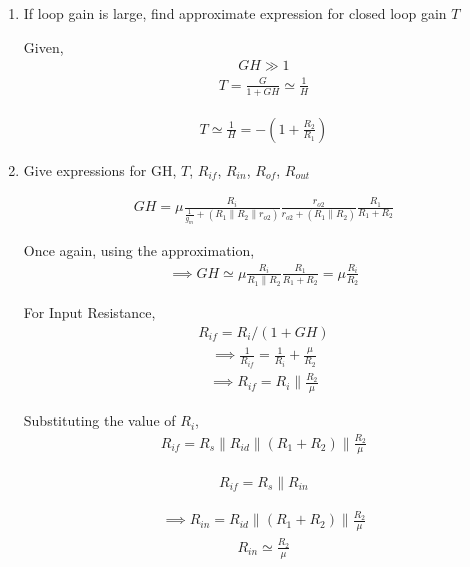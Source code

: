 \begin{enumerate}[label=\thesection.\arabic*.,ref=\thesection.\theenumi]
\item
If loop gain is large, find approximate expression for closed loop gain $T$

\solution
Given,
\begin{align}
    GH \gg 1
\end{align}
\begin{align}
    T = \frac{G}{1+GH}\simeq \frac{1}{H}
\end{align}


\begin{align}
    T \simeq \frac{1}{H}=-\left(1+\frac{R_{2}}{R_{1}}\right)
\end{align}

\item
Give expressions for GH, $T$, $R_{if}$, $R_{in}$, $R_{of}$, $R_{out}$

\solution
\begin{align}
    GH=\mu \frac{R_{i}}{\frac{1}{g_{m}}+(R_{1}\|R_{2}\| r_{o 2})} \frac{r_{o 2}}{r_{o 2}+(R_{1} \| R_{2})} \frac{R_{1}}{R_{1}+R_{2}}
\end{align}

Once again, using the approximation,
\begin{align}
    \implies GH \simeq \mu \frac{R_{i}}{R_{1} \| R_{2}} \frac{R_{1}}{R_{1}+R_{2}}=\mu \frac{R_{i}}{R_{2}}
\end{align}

For Input Resistance,
\begin{align}
    R_{if}=R_{i} /(1+GH)
\end{align}
\begin{align}
    \implies \frac{1}{R_{i f}}=\frac{1}{R_{i}}+\frac{\mu}{R_{2}}
\end{align}
\begin{align}
    \implies R_{i f}=R_{i} \| \frac{R_{2}}{\mu}
\end{align}

Substituting the value of $R_{i}$,
\begin{align}
    R_{if}=R_{s}\|R_{id}\|(R_{1}+R_{2}) \| \frac{R_{2}}{\mu}
\end{align}

\begin{align}
    R_{if}=R_{s} \| R_{in}
\end{align}

\begin{align}
    \implies R_{in}=R_{i d}\|(R_{1}+R_{2})\| \frac{R_{2}}{\mu}
\end{align}
\begin{align}
    R_{in} \simeq \frac{R_{2}}{\mu}
\end{align}


\end{enumerate}

